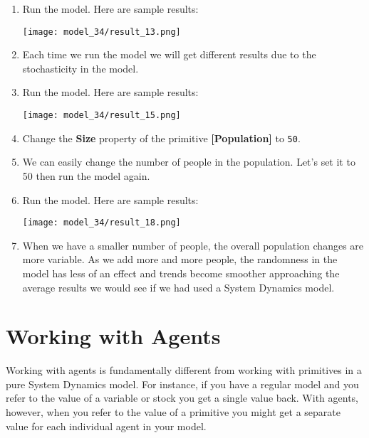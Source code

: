 \documentclass[]{memoir}
\makeatletter
\def\maxwidth{\ifdim\Gin@nat@width>\linewidth\linewidth
\else\Gin@nat@width\fi}
\let\Oldincludegraphics\includegraphics
\renewcommand{\includegraphics}[1]{\Oldincludegraphics[width=\maxwidth]{#1}}
\newcommand{\p}[1]{\textbf{{[}#1{]}}}
\newcommand{\e}[1]{\texttt{#1}}
\renewcommand{\a}[1]{\textbf{#1}}
\makeatother
\begin{document}
\begin{oframed}
\begin{enumerate}
\item Run the model. Here are sample results:\par \begin{minipage}{\linewidth}  \centering \texttt{[image: model\_34/result\_13.png]}
\end{minipage}
\item 

Each time we run the model we will get different results due to the stochasticity in the model.


\item Run the model. Here are sample results:\par \begin{minipage}{\linewidth}  \centering \texttt{[image: model\_34/result\_15.png]}
\end{minipage}
\item  Change the \a{Size} property of the primitive \p{Population} to \e{50}.
\item 

We can easily change the number of people in the population. Let's set it to 50 then run the model again.


\item Run the model. Here are sample results:\par \begin{minipage}{\linewidth}  \centering \texttt{[image: model\_34/result\_18.png]}
\end{minipage}
\item 

When we have a smaller number of people, the overall population changes are more variable. As we add more and more people, the randomness in the model has less of an effect and trends become smoother approaching the average results we would see if we had used a System Dynamics model.



\end{enumerate} \end{oframed}

\section{Working with Agents}

Working with agents is fundamentally different from working with
primitives in a pure System Dynamics model. For instance, if you have a
regular model and you refer to the value of a variable or stock you get
a single value back. With agents, however, when you refer to the value
of a primitive you might get a separate value for each individual agent
in your model.
\end{document}
